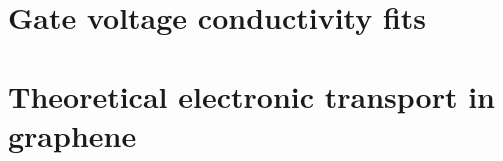 \documentclass{report}
\begin{document}
\begin{appendices}
	\chapter{Gate voltage conductivity fits}\label{app:fits}
	
	\chapter{Theoretical electronic transport in graphene}\label{app:transport_theoretical}
	
	
		
\end{appendices}
\end{document}
